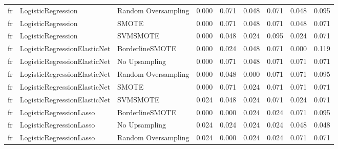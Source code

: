 \begin{tabular}{lllllllll}
      fr &           LogisticRegression & Random Oversampling & 0.000 &                     0.071 &                 0.048 &                  0.071 &                                   0.048 &     0.095 \\
      fr &           LogisticRegression &               SMOTE & 0.000 &                     0.071 &                 0.048 &                  0.071 &                                   0.048 &     0.071 \\
      fr &           LogisticRegression &            SVMSMOTE & 0.000 &                     0.048 &                 0.024 &                  0.095 &                                   0.024 &     0.071 \\
      fr & LogisticRegressionElasticNet &     BorderlineSMOTE & 0.000 &                     0.024 &                 0.048 &                  0.071 &                                   0.000 &     0.119 \\
      fr & LogisticRegressionElasticNet &       No Upsampling & 0.000 &                     0.071 &                 0.048 &                  0.071 &                                   0.071 &     0.071 \\
      fr & LogisticRegressionElasticNet & Random Oversampling & 0.000 &                     0.048 &                 0.000 &                  0.071 &                                   0.071 &     0.095 \\
      fr & LogisticRegressionElasticNet &               SMOTE & 0.000 &                     0.071 &                 0.024 &                  0.071 &                                   0.071 &     0.071 \\
      fr & LogisticRegressionElasticNet &            SVMSMOTE & 0.024 &                     0.048 &                 0.024 &                  0.071 &                                   0.024 &     0.071 \\
      fr &      LogisticRegressionLasso &     BorderlineSMOTE & 0.000 &                     0.000 &                 0.024 &                  0.024 &                                   0.071 &     0.095 \\
      fr &      LogisticRegressionLasso &       No Upsampling & 0.024 &                     0.024 &                 0.024 &                  0.024 &                                   0.048 &     0.048 \\
      fr &      LogisticRegressionLasso & Random Oversampling & 0.024 &                     0.000 &                 0.024 &                  0.024 &                                   0.071 &     0.071 \\

\end{tabular}
